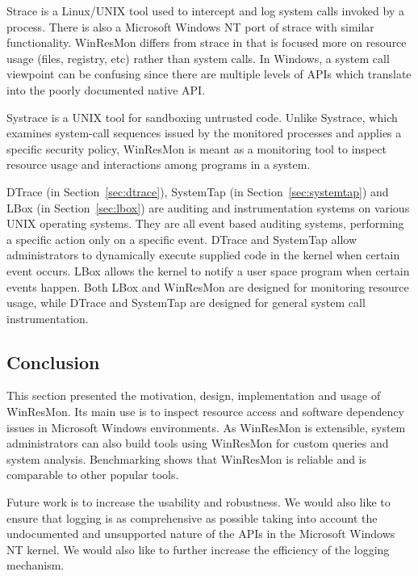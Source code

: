 Strace \cite{strace} is a Linux/UNIX tool used to intercept and log system
calls invoked by a process.  There is also a Microsoft Windows NT port of
strace \cite{bindview} with similar functionality.  WinResMon differs from
strace in that is focused more on resource usage (files, registry, etc) rather
than system calls.  In Windows, a system call viewpoint can be
confusing since there are multiple levels of APIs which translate into the poorly
documented native API.

Systrace \cite{provos2003improving} is a UNIX tool for sandboxing untrusted code.  Unlike
Systrace, which examines system-call sequences issued by the monitored
processes and applies a specific security policy, WinResMon is meant as a
monitoring tool to inspect resource usage and interactions among programs in a
system.

DTrace (in Section~\ref{sec:dtrace}),
SystemTap (in Section~\ref{sec:systemtap}) and
LBox (in Section~\ref{sec:lbox}) are
auditing and instrumentation systems on various UNIX operating systems.  They
are all event based auditing systems, performing a specific action only on a
specific event.  DTrace and SystemTap allow administrators to dynamically
execute supplied code in the kernel when certain event occurs.  LBox allows
the kernel to notify a user space program when certain events happen.  Both
LBox and WinResMon are designed for monitoring resource usage, while DTrace and
SystemTap are designed for general system call instrumentation.


\subsection{Conclusion}

This section presented the motivation, design, implementation and usage of
WinResMon.  Its main use is to inspect resource access and software dependency
issues in Microsoft Windows environments.  As WinResMon is extensible, system
administrators can also build tools using WinResMon for custom queries and
system analysis.  Benchmarking shows that WinResMon is reliable and is
comparable to other popular tools.

Future work is to increase the usability and robustness.
We would also like to ensure that logging is as comprehensive as possible
taking into account the undocumented
and unsupported nature of the APIs in the Microsoft Windows NT kernel.
We would also like to further increase the efficiency of the
logging mechanism.


